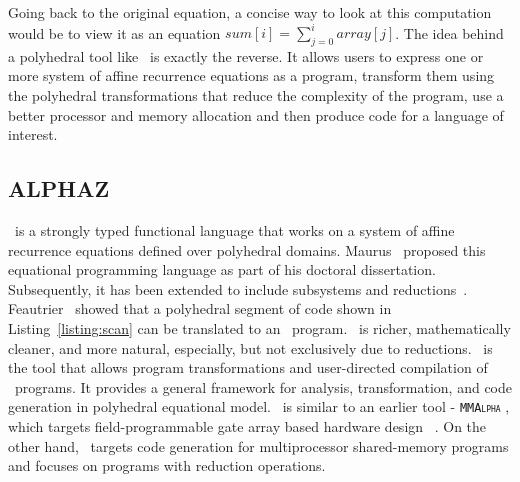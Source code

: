 Going back to the original equation, a concise way to look at this computation would be to view it as an equation $\displaystyle sum[i] = \sum_{j=0}^{i}array[j]$.  The idea behind a polyhedral tool like \alphaz\ is exactly the reverse. It allows users to express one or more system of affine recurrence equations as a program, transform them using the polyhedral transformations that reduce the complexity of the program, use a better processor and memory allocation and then produce code for a language of interest.

\subsection{\uppercase{ALPHAZ}}
\alfa\ is a strongly typed functional language that works on a system of affine recurrence equations defined over polyhedral domains. Maurus~\cite{Mauras1989}  proposed this equational programming language as part of his doctoral dissertation.   Subsequently, it has been extended to include subsystems and reductions~\cite{leverge-thesis, leverge-parle92, fdupont-asap96, florent-thesis, DupontQuRi93}. Feautrier~\cite{feautrier91} showed that a polyhedral segment of code shown in Listing~\ref{listing:scan} can be translated to an \alfa\ program. \alfa\ is richer, mathematically cleaner, and more natural, especially, but not exclusively due to reductions.  \alphaz\ is the tool that allows program transformations and user-directed compilation of \alfa\ programs.  It provides a general framework for analysis, transformation, and code generation in polyhedral equational model.  \alphaz\ is similar to an earlier tool - \textsc{\texttt{MMAlpha}} , which targets field-programmable gate array based hardware design ~\cite{guillou-mma}. On the other hand, \alphaz\ targets code generation for multiprocessor shared-memory programs and focuses on programs with reduction operations. 

